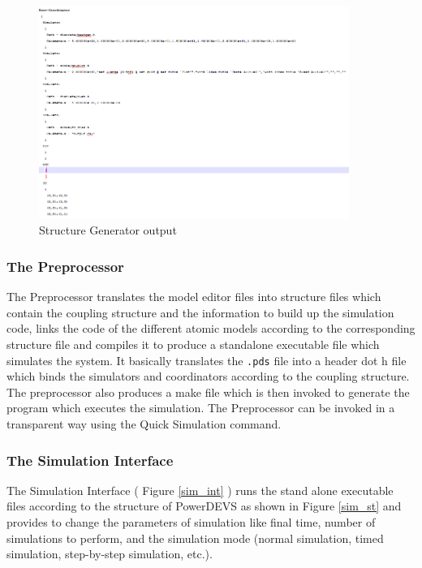 \documentclass[titlepage]{article}%
\begin{document}
\begin{figure}[h!]
  \centering
    \includegraphics[width=0.9\textwidth]{Fig7.png}
    \caption{Structure Generator output}
    \label{Struc_gen}
\end{figure}



\subsubsection{The Preprocessor}
The Preprocessor translates the model editor files into structure files which contain the coupling structure and the information to build up the simulation code, links the code of the different atomic models according to the corresponding structure file and compiles it to produce a standalone executable file which simulates the system. It basically translates the \texttt{.pds} file into a header dot h file which binds the simulators and coordinators according to the coupling structure. The preprocessor also produces a make file which is then invoked to generate the program which executes the simulation. The Preprocessor can be invoked in a transparent way using the Quick Simulation command.

\subsubsection{The Simulation Interface }
The Simulation Interface ( Figure \ref{sim_int} ) runs the stand alone executable files according to the structure of PowerDEVS as shown in Figure \ref{sim_st} and provides to change the parameters of simulation like final time, number of simulations to perform, and the simulation mode (normal simulation, timed simulation, step-by-step simulation, etc.).
\end{document}
